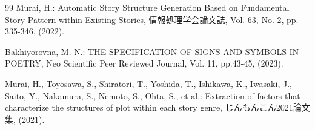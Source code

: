 \documentclass[a4j]{jarticle}
\begin{document}
\begin{thebibliography}{99}
Murai, H.: Automatic Story Structure Generation Based on Fundamental Story Pattern within Existing Stories, 情報処理学会論文誌, Vol. 63, No. 2, pp. 335-346, (2022).

Bakhiyorovna, M. N.: THE SPECIFICATION OF SIGNS AND SYMBOLS IN POETRY, Neo Scientific Peer Reviewed Journal, Vol. 11, pp.43-45, (2023).

Murai, H., Toyosawa, S., Shiratori, T., Yoshida, T., Ishikawa, K., Iwasaki, J., Saito, Y., Nakamura, S., Nemoto, S., Ohta, S., et al.: Extraction of factors that characterize the structures of plot within each story genre, じんもんこん2021論文集, (2021).



\end{thebibliography}
\end{document}
